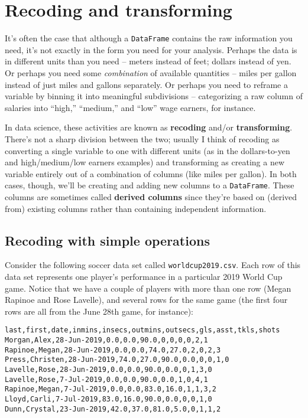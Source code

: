 
\chapter{Recoding and transforming}

It's often the case that although a \texttt{DataFrame} contains the raw
information you need, it's not exactly in the form you need for your analysis.
Perhaps the data is in different units than you need -- meters instead of feet;
dollars instead of yen. Or perhaps you need some \textit{combination} of
available quantities -- miles per gallon instead of just miles and gallons
separately. Or perhaps you need to reframe a variable by binning it into
meaningful subdivisions -- categorizing a raw column of salaries into ``high,''
``medium,'' and ``low'' wage earners, for instance.


In data science, these activities are known as \textbf{recoding} and/or
\textbf{transforming}. There's not a sharp division between the two; usually I
think of recoding as converting a single variable to one with different units
(as in the dollars-to-yen and high/medium/low earners examples) and
transforming as creating a new variable entirely out of a combination of
columns (like miles per gallon). In both cases, though, we'll be creating and
adding new columns to a \texttt{DataFrame}. These columns are sometimes called
\textbf{derived columns} since they're based on (derived from) existing columns
rather than containing independent information.

\section{Recoding with simple operations}


Consider the following soccer data set called \texttt{worldcup2019.csv}.
Each row of this data set represents one player's performance in a particular
2019 World Cup game. Notice that we have a couple of players with more than one
row (Megan Rapinoe and Rose Lavelle), and several rows for the same game (the
first four rows are all from the June 28th game, for instance):

\begin{Verbatim}[fontsize=\small,samepage=true,frame=lines,framesep=3mm]
last,first,date,inmins,insecs,outmins,outsecs,gls,asst,tkls,shots
Morgan,Alex,28-Jun-2019,0.0,0.0,90.0,0,0,0,0,2,1
Rapinoe,Megan,28-Jun-2019,0.0,0.0,74.0,27.0,2,0,2,3
Press,Christen,28-Jun-2019,74.0,27.0,90.0,0.0,0,0,1,0
Lavelle,Rose,28-Jun-2019,0.0,0.0,90.0,0.0,0,1,3,0
Lavelle,Rose,7-Jul-2019,0.0,0.0,90.0,0.0,1,0,4,1
Rapinoe,Megan,7-Jul-2019,0.0,0.0,83.0,16.0,1,1,3,2
Lloyd,Carli,7-Jul-2019,83.0,16.0,90.0,0.0,0,0,1,0
Dunn,Crystal,23-Jun-2019,42.0,37.0,81.0,5.0,0,1,1,2
\end{Verbatim}

